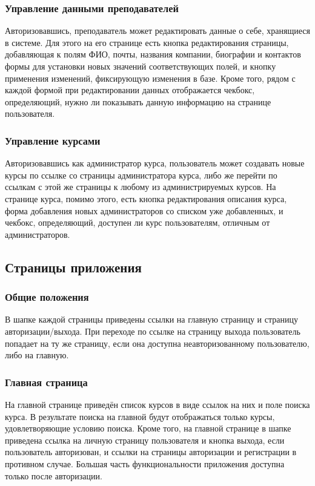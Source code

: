 \documentclass[11pt]{article}
\begin{document}
\subsubsection{Управление данными преподавателей}
\label{sec:org5500235}
Авторизовавшись, преподаватель может редактировать данные о себе, хранящиеся в системе. Для
этого на его странице есть кнопка редактирования страницы, добавляющая к полям ФИО, почты,
названия компании, биографии и контактов формы для установки новых значений соответствующих
полей, и кнопку применения изменений, фиксирующую изменения в базе. Кроме того, рядом с каждой формой при
редактировании данных отображается чекбокс, определяющий, нужно ли показывать данную
информацию на странице пользователя.
\subsubsection{Управление курсами}
\label{sec:org939815a}
Авторизовавшись как администратор курса, пользователь может создавать новые курсы по ссылке
со страницы администратора курса, либо же перейти по ссылкам с этой же страницы к любому из
администрируемых курсов. На странице курса, помимо этого, есть кнопка редактирования описания
курса, форма добавления новых администраторов со списком уже добавленных, и чекбокс,
определяющий, доступен ли курс пользователям, отличным от администраторов.
\subsection{Страницы приложения}
\label{sec:orgf3ae4c8}
\subsubsection{Общие положения}
\label{sec:orgdcd657f}
В шапке каждой страницы приведены ссылки на главную страницу и страницу авторизации/выхода.
При переходе по ссылке на страницу выхода пользователь попадает на ту же страницу, если она
доступна неавторизованному пользователю, либо на главную.
\subsubsection{Главная страница}
\label{sec:org1307922}
На главной странице приведён список курсов в виде ссылок на них и поле
поиска курса. В результате поиска на главной будут отображаться только курсы, удовлетворяющие
условию поиска. Кроме того, на главной странице в шапке приведена ссылка на личную страницу
пользователя и кнопка выхода, если пользователь авторизован, и ссылки на страницы авторизации
и регистрации в противном случае. Большая часть функциональности приложения доступна только
после авторизации.
\end{document}

